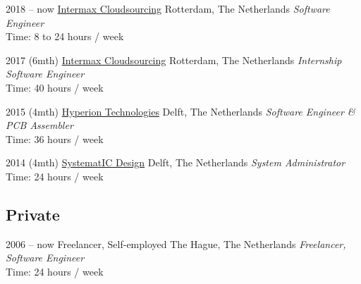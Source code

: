 \documentclass[]{friggeri-cv}
\begin{document}
\begin{entrylist}


\entry
{2018 -- now}
{\href{https://intermax.nl/}{Intermax Cloudsourcing}}
{Rotterdam, The Netherlands}
{\emph{Software Engineer} \\
Time: 8 to 24 hours / week}


\entry
{2017 (6mth)}
{\href{https://intermax.nl/}{Intermax Cloudsourcing}}
{Rotterdam, The Netherlands}
{\emph{Internship Software Engineer} \\
Time: 40 hours / week}


\entry
{2015 (4mth)}
{\href{https://hyperiontechnologies.nl/}{Hyperion Technologies}}
{Delft, The Netherlands}
{\emph{Software Engineer \& PCB Assembler} \\
Time: 36 hours / week}


\entry
{2014 (4mth)}
{\href{https://systematic.nl/}{SystematIC Design}}
{Delft, The Netherlands}
{\emph{System Administrator} \\
Time: 24 hours / week}


\end{entrylist}

\subsection{Private}

\begin{entrylist}


\entry
{2006 -- now}
{Freelancer, Self-employed}
{The Hague, The Netherlands}
{\emph{Freelancer, Software Engineer} \\
Time: 24 hours / week}


\end{entrylist}

\newpage{}

\end{document}
